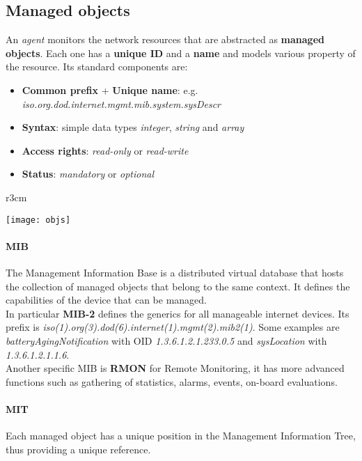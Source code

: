 \subsection{Managed objects}
An \textit{agent} monitors the network resources that are abstracted as \textbf{managed objects}. Each one has a \textbf{unique ID} and a \textbf{name} and models various property of the resource. Its standard components are:
\begin{itemize}
	\item \textbf{Common prefix} + \textbf{Unique name}: e.g. \textit{iso.org.dod.internet.mgmt.mib.system.sysDescr}
	\item \textbf{Syntax}: simple data types \textit{integer}, \textit{string} and \textit{array}
	\item \textbf{Access rights}: \textit{read-only} or \textit{read-write}
	\item \textbf{Status}: \textit{mandatory} or \textit{optional}
\end{itemize}

\begin{wrapfigure}[7]{r}{3cm}
	\vspace{-1.5cm}
	\begin{center}
		\texttt{[image: objs]}
	\end{center}
\end{wrapfigure}
\paragraph{MIB}
The Management Information Base is a distributed virtual database that hosts the collection of managed objects that belong to the same context. It defines the capabilities of the device that can be managed.\\
In particular \textbf{MIB-2} defines the generics for all manageable internet devices. Its prefix is \textit{iso(1).org(3).dod(6).internet(1).mgmt(2).mib2(1)}. Some examples are \textit{batteryAgingNotification} with OID \textit{1.3.6.1.2.1.233.0.5} and \textit{sysLocation} with \textit{1.3.6.1.2.1.1.6}.\\
Another specific MIB is \textbf{RMON} for Remote Monitoring, it has more advanced functions such as gathering of statistics, alarms, events, on-board evaluations.
\paragraph{MIT}
Each managed object has a unique position in the Management Information Tree, thus providing a unique reference.

